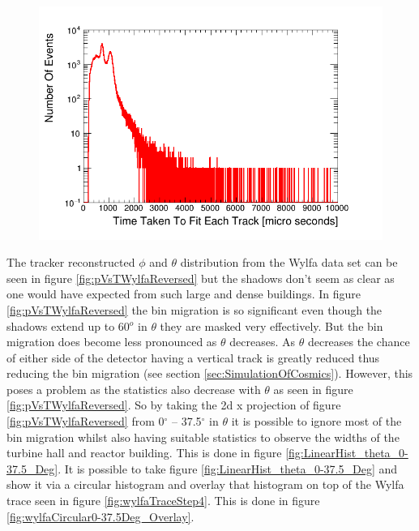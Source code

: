  \begin{figure}[!h]
 \centering
 \includegraphics[width=0.7\linewidth]{Chapter5/Figs/Raster/wylfaTrackerTimeLog.png}
 \label{fig:wylfaTrackerTimeLog}
\end{figure}

The tracker reconstructed $\phi$ and $\theta$ distribution from the Wylfa data set can be seen in figure \ref{fig:pVsTWylfaReversed} but the shadows don't seem as clear as one would have expected from such large and dense buildings. In figure \ref{fig:pVsTWylfaReversed} the bin migration is so significant even though the shadows extend up to 60$^o$ in $\theta$ they are masked very effectively. But the bin migration does become less pronounced as $\theta$ decreases. As $\theta$ decreases the chance of either side of the detector having a vertical track is greatly reduced thus reducing the bin migration (see section \ref{sec:SimulationOfCosmics}). However, this poses a problem as the statistics also decrease with $\theta$ as seen in figure \ref{fig:pVsTWylfaReversed}. So by taking the 2d x projection of figure \ref{fig:pVsTWylfaReversed} from 0$^\circ$ -- 37.5$^\circ$ in $\theta$ it is possible to ignore most of the bin migration whilst also having suitable statistics to observe the widths of the turbine hall and reactor building. This is done in figure \ref{fig:LinearHist_theta_0-37.5_Deg}. It is possible to take figure \ref{fig:LinearHist_theta_0-37.5_Deg} and show it via a circular histogram and overlay that histogram on top of the Wylfa trace seen in figure \ref{fig:wylfaTraceStep4}. This is done in figure \ref{fig:wylfaCircular0-37.5Deg_Overlay}. 

